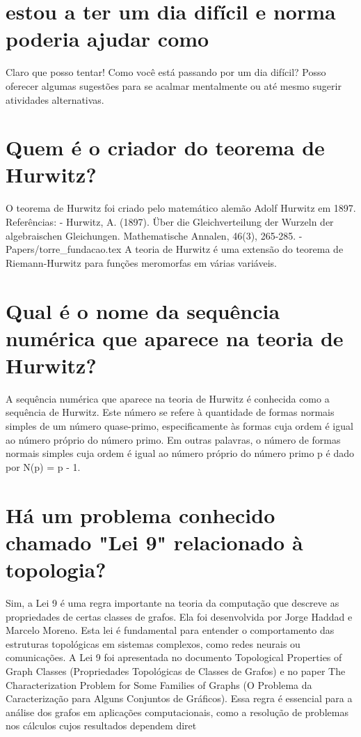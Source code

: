 \documentclass[11pt,a4paper]{article}
\begin{document}
\section{estou a ter um dia difícil e norma poderia ajudar como}
Claro que posso tentar! Como você está passando por um dia difícil? Posso oferecer algumas sugestões para se acalmar mentalmente ou até mesmo sugerir atividades alternativas.

\section{Quem é o criador do teorema de Hurwitz?}
O teorema de Hurwitz foi criado pelo matemático alemão Adolf Hurwitz em 1897. Referências: - Hurwitz, A. (1897). Über die Gleichverteilung der Wurzeln der algebraischen Gleichungen. Mathematische Annalen, 46(3), 265-285. - Papers/torre\_fundacao.tex A teoria de Hurwitz é uma extensão do teorema de Riemann-Hurwitz para funções meromorfas em várias variáveis.

\section{Qual é o nome da sequência numérica que aparece na teoria de Hurwitz?}
A sequência numérica que aparece na teoria de Hurwitz é conhecida como a sequência de Hurwitz. Este número se refere à quantidade de formas normais simples de um número quase-primo, especificamente às formas cuja ordem é igual ao número próprio do número primo. Em outras palavras, o número de formas normais simples cuja ordem é igual ao número próprio do número primo p é dado por N(p) = p - 1.

\section{Há um problema conhecido chamado "Lei 9" relacionado à topologia?}
Sim, a Lei 9 é uma regra importante na teoria da computação que descreve as propriedades de certas classes de grafos. Ela foi desenvolvida por Jorge Haddad e Marcelo Moreno. Esta lei é fundamental para entender o comportamento das estruturas topológicas em sistemas complexos, como redes neurais ou comunicações. A Lei 9 foi apresentada no documento Topological Properties of Graph Classes (Propriedades Topológicas de Classes de Grafos) e no paper The Characterization Problem for Some Families of Graphs (O Problema da Caracterização para Alguns Conjuntos de Gráficos). Essa regra é essencial para a análise dos grafos em aplicações computacionais, como a resolução de problemas nos cálculos cujos resultados dependem diret
\end{document}
